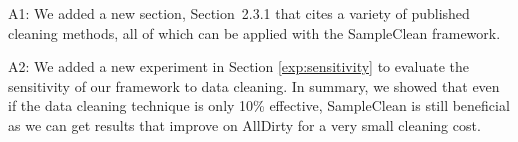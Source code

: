 A1: We added a new section, Section~2.3.1 that cites a variety of published cleaning methods, all of which
can be applied with the SampleClean framework.

A2: We added a new experiment in Section \ref{exp:sensitivity} to evaluate the sensitivity of our framework to data cleaning. In summary, we showed that even if the data cleaning technique is only 10\% effective, SampleClean is still beneficial as we can get results that improve on AllDirty for a very small cleaning cost. 








%

%
